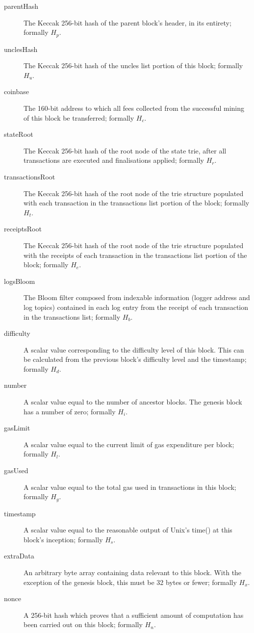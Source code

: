 \documentclass[9pt,oneside]{amsart}
\begin{document}
\begin{multicols}{2}

\begin{description}
\item[parentHash] The Keccak 256-bit hash of the parent block's header, in its entirety; formally $H_p$.
\item[unclesHash] The Keccak 256-bit hash of the uncles list portion of this block; formally $H_u$.
\item[coinbase] The 160-bit address to which all fees collected from the successful mining of this block be transferred; formally $H_c$.
\item[stateRoot] The Keccak 256-bit hash of the root node of the state trie, after all transactions are executed and finalisations applied; formally $H_r$.
\item[transactionsRoot] The Keccak 256-bit hash of the root node of the trie structure populated with each transaction in the transactions list portion of the block; formally $H_t$.
\item[receiptsRoot] The Keccak 256-bit hash of the root node of the trie structure populated with the receipts of each transaction in the transactions list portion of the block; formally $H_e$.
\item[logsBloom] The Bloom filter composed from indexable information (logger address and log topics) contained in each log entry from the receipt of each transaction in the transactions list; formally $H_b$.
\item[difficulty] A scalar value corresponding to the difficulty level of this block. This can be calculated from the previous block's difficulty level and the timestamp; formally $H_d$.
\item[number] A scalar value equal to the number of ancestor blocks. The genesis block has a number of zero; formally $H_i$.
\item[gasLimit] A scalar value equal to the current limit of gas expenditure per block; formally $H_l$.
\item[gasUsed] A scalar value equal to the total gas used in transactions in this block; formally $H_g$.
\item[timestamp] A scalar value equal to the reasonable output of Unix's time() at this block's inception; formally $H_s$.
\item[extraData] An arbitrary byte array containing data relevant to this block. With the exception of the genesis block, this must be 32 bytes or fewer; formally $H_x$.
\item[nonce] A 256-bit hash which proves that a sufficient amount of computation has been carried out on this block; formally $H_n$.
\end{description}


\end{multicols}
\end{document}
